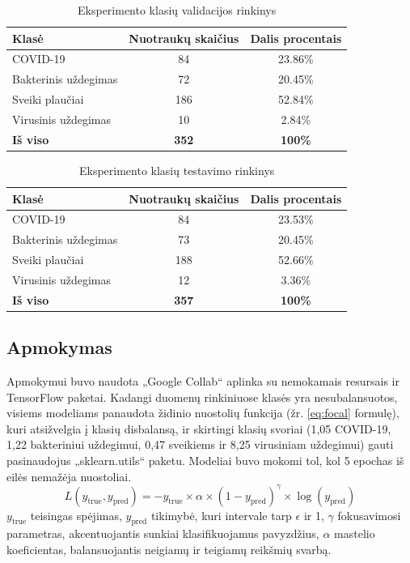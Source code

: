 \documentclass[fleqn]{VUMIFKompMagistrinis}
\begin{document}
\begin{table}[H]\footnotesize
  \centering
  \caption{Eksperimento klasių validacijos rinkinys}
  \begin{tabular}{|l|c|c|}
    \hline
    Klasė       & Nuotraukų skaičius & Dalis procentais \\ \hline
    COVID-19       & 84               & 23.86\%                   \\
    Bakterinis uždegimas   & 72               & 20.45\%                   \\
    Sveiki plaučiai     & 186              & 52.84\%                   \\
    Virusinis uždegimas       & 10               & 2.84\%                    \\ 
    \textbf{Iš viso} & \textbf{352}  & \textbf{100\%}            \\ \hline
  \end{tabular}
  \label{tab:val_set}
\end{table}
\begin{table}[H]\footnotesize
  \centering
  \caption{Eksperimento klasių testavimo rinkinys}
  \begin{tabular}{|l|c|c|}
    \hline
    Klasė       & Nuotraukų skaičius & Dalis procentais \\ \hline
    COVID-19        & 84               & 23.53\%                    \\
    Bakterinis uždegimas   & 73               & 20.45\%                    \\
    Sveiki plaučiai     & 188              & 52.66\%                    \\
    Virusinis uždegimas       & 12               & 3.36\%                     \\ 
    \textbf{Iš viso} & \textbf{357}  & \textbf{100\%}             \\ \hline
  \end{tabular}
  \label{tab:test_set}
\end{table}

\subsection{Apmokymas}
Apmokymui buvo naudota „Google Collab“ aplinka su nemokamais resursais ir TensorFlow paketai. Kadangi duomenų rinkiniuose klasės yra nesubalansuotos, visiems modeliams panaudota židinio nuostolių funkcija (žr. \ref{eq:focal} formulę), kuri atsižvelgia į klasių disbalansą, ir skirtingi klasių svoriai (1,05 COVID-19, 1,22 bakteriniui uždegimui, 0,47 sveikiems ir 8,25 virusiniam uždegimui) gauti pasinaudojus „sklearn.utils“ paketu. Modeliai buvo mokomi tol, kol 5 epochas iš eilės nemažėja nuostoliai. 
\begin{equation}\label{eq:focal}
L(y_{\text{true}}, y_{\text{pred}}) = - y_{\text{true}} \times \alpha \times (1 - y_{\text{pred}})^\gamma \times \log(y_{\text{pred}})
\end{equation}
\( y_{\text{true}} \) teisingas spėjimas, \( y_{\text{pred}} \) tikimybė, kuri intervale tarp \(\epsilon\) ir 1, \( \gamma \) fokusavimosi parametras, akcentuojantis sunkiai klasifikuojamus pavyzdžius,  \( \alpha \) mastelio koeficientas, balansuojantis neigiamų ir teigiamų reikšmių svarbą.
\end{document}
